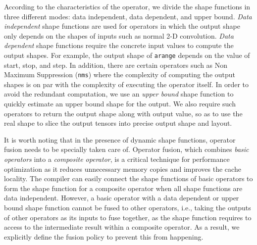         According to the characteristics of the operator, we divide the shape functions in three different modes: data independent, data dependent, and upper bound.
        {\em Data independent} shape functions are used for operators in which the output shape only depends on the shapes of inputs such as normal 2-D convolution.
        {\em Data dependent} shape functions require the concrete input values to compute the output shapes. For example, the output shape of \texttt{arange} depends on the value of start, stop, and step.
        In addition, there are certain operators such as Non Maximum Suppression (\texttt{nms}) where the complexity of computing the output shapes is on par with the complexity of executing the operator itself.
        In order to avoid the redundant computation, we use an {\em upper bound} shape function to quickly estimate an upper bound shape for the output.
        We also require such operators to return the output shape along with output value, so as to use the real shape to slice the output tensors into precise output shape and layout.

        It is worth noting that in the presence of dynamic shape functions, operator fusion needs to be specially taken care of.
        Operator fusion, which combines {\em basic operators} into a {\em composite operator}, is a critical technique for performance optimization as it reduces unnecessary memory copies and improves the cache locality.
        The compiler can easily connect the shape functions of basic operators to form the shape function for a composite operator when all shape functions are data independent.
        However, a basic operator with a data dependent or upper bound shape function cannot be fused to other operators, i.e., taking the outputs of other operators as its inputs to fuse together, as the shape function requires to access to the intermediate result within a composite operator.
        As a result, we explicitly define the fusion policy to prevent this from happening.

